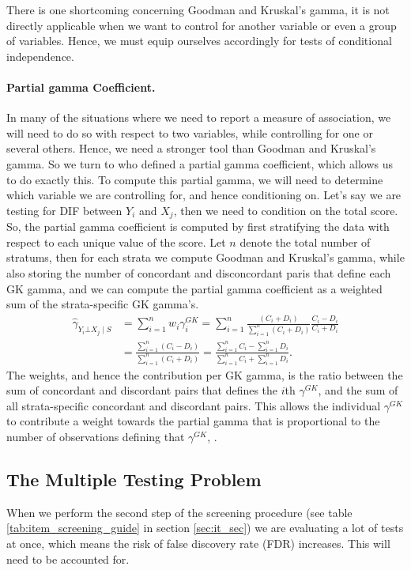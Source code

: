 \documentclass[a4project,12pt]{article}
\theoremstyle{examplestyle}
\theoremstyle{defstyle}
\theoremstyle{thmstyle}
\begin{document}
There is one shortcoming concerning Goodman and Kruskal's gamma, it is not directly applicable when we want to control for another variable or even a group of variables. Hence, we must equip ourselves accordingly for tests of conditional independence. 

\paragraph{Partial gamma Coefficient.} In many of the situations where we need to report a measure of association, we will need to do so with respect to two variables, while controlling for one or several others. Hence, we need a stronger tool than Goodman and Kruskal's gamma. So we turn to \cite{davis-1967} who defined a partial gamma coefficient, which allows us to do exactly this. To compute this partial gamma, we will need to determine which variable we are controlling for, and hence conditioning on. Let's say we are testing for DIF between $Y_i$ and $X_j$, then we need to condition on the total score. So, the partial gamma coefficient is computed by first stratifying the data with respect to each unique value of the score. Let $n$ denote the total number of stratums, then for each strata we compute Goodman and Kruskal's gamma, while also storing the number of concordant and disconcordant paris that define each GK gamma, and we can compute the partial gamma coefficient as a weighted sum of the strata-specific GK gamma's. 
\begin{align}
    \hat{\gamma}_{Y_i\bot X_j\mid S} &= \sum_{i=1}^n w_i\gamma^{GK}_i = \sum_{i=1}^n\frac{(C_i+D_i)}{\sum_{i=1}^n(C_i+D_i)}\frac{C_i-D_i}{C_i+D_i} \\
    &= \frac{\sum_{i=1}^n(C_i-D_i)}{\sum_{i=1}^n(C_i+D_i)} = \frac{\sum_{i=1}^nC_i-\sum_{i=1}^nD_i}{\sum_{i=1}^nC_i+\sum_{i=1}^nD_i}.
\end{align}
The weights, and hence the contribution per GK gamma, is the ratio between the sum of concordant and discordant pairs that defines the $i$th $\gamma^{GK}$, and the sum of all strata-specific concordant and discordant pairs. This allows the individual $\gamma^{GK}$ to contribute a weight towards the partial gamma that is proportional to the number of observations defining that $\gamma^{GK}$, \cite{agresti-1984}.  



\subsection{The Multiple Testing Problem}
When we perform the second step of the screening procedure (see table \ref{tab:item_screening_guide} in section \ref{sec:it_sec}) we are evaluating a lot of tests at once, which means the risk of false discovery rate (FDR) increases. This will need to be accounted for. 
\end{document}

